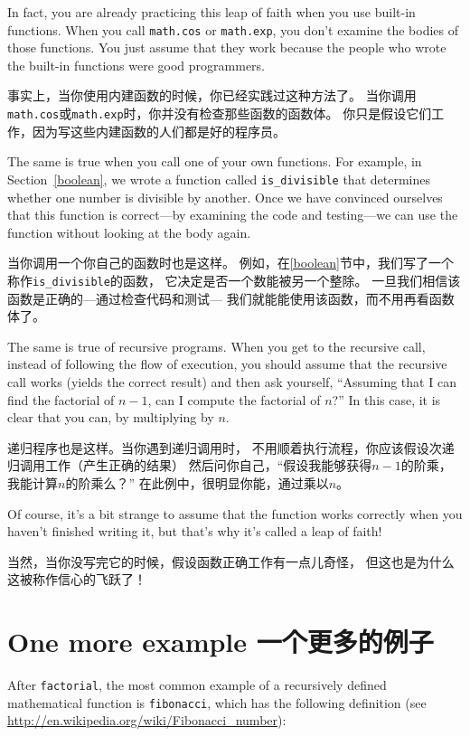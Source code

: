\documentclass[10pt]{book}
\begin{document}
\begin{CJK}{UTF8}{gbsn}
In fact, you are already practicing this leap of faith when you use
built-in functions.  When you call {\tt math.cos} or {\tt math.exp},
you don't examine the bodies of those functions.  You just
assume that they work because the people who wrote the built-in
functions were good programmers.

事实上，当你使用内建函数的时候，你已经实践过这种方法了。
当你调用{\tt math.cos}或{\tt math.exp}时，你并没有检查那些函数的函数体。
你只是假设它们工作，因为写这些内建函数的人们都是好的程序员。

The same is true when you call one of your own functions.  For
example, in Section~\ref{boolean}, we wrote a function called 
\verb"is_divisible" that determines whether one number is divisible by
another.  Once we have convinced ourselves that this function is
correct---by examining the code and testing---we can use the function
without looking at the body again.

当你调用一个你自己的函数时也是这样。
例如，在\ref{boolean}节中，我们写了一个称作\verb"is_divisible"的函数，
它决定是否一个数能被另一个整除。
一旦我们相信该函数是正确的---通过检查代码和测试---
我们就能能使用该函数，而不用再看函数体了。

The same is true of recursive programs.  When you get to the recursive
call, instead of following the flow of execution, you should assume
that the recursive call works (yields the correct result) and then ask
yourself, ``Assuming that I can find the factorial of $n-1$, can I
compute the factorial of $n$?''  In this case, it is clear that you
can, by multiplying by $n$.

递归程序也是这样。当你遇到递归调用时，
不用顺着执行流程，你应该假设次递归调用工作（产生正确的结果）
然后问你自己，``假设我能够获得$n-1$的阶乘，我能计算$n$的阶乘么？''
在此例中，很明显你能，通过乘以$n$。

Of course, it's a bit strange to assume that the function works
correctly when you haven't finished writing it, but that's why
it's called a leap of faith!

当然，当你没写完它的时候，假设函数正确工作有一点儿奇怪，
但这也是为什么这被称作信心的飞跃了！


\section{One more example 一个更多的例子}
\label{one.more.example}

After {\tt factorial}, the most common example of a recursively
defined mathematical function is {\tt fibonacci}, which has the
following definition (see
  \url{http://en.wikipedia.org/wiki/Fibonacci_number}):
  

\end{CJK}
\end{document}
